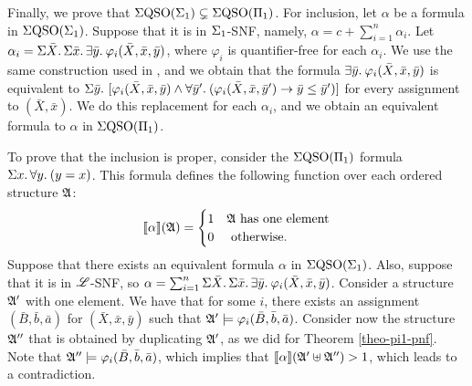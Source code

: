 Finally, we prove that $\Sigma{\rm QSO}(\Sigma_{1})\subsetneq\Sigma{\rm QSO}(\Pi_{1})$. 
For inclusion, let $\alpha$ be a formula in $\Sigma{\rm QSO}(\Sigma_{1})$. 
Suppose that it is in $\Sigma_{1}$-SNF, namely, $\alpha = c + \sum_{i = 1}^{n}\alpha_i$. 
Let $\alpha_i = \Sigma{\bar{X}}.\,\Sigma{\bar{x}}.\,\exists{\bar{y}}.\:\varphi_i(\bar{X},\bar{x},\bar{y})$, where $\varphi_i$ is quantifier-free for each $\alpha_i$. 
We use the same construction used in \cite{SalujaST95}, and we obtain that the formula $\exists{\bar{y}}.\:\varphi_i(\bar{X},\bar{x},\bar{y})$ is equivalent to $\Sigma{\bar{y}}.\,\,[\varphi_i(\bar{X},\bar{x},\bar{y}) \wedge \forall{\bar{y}'}.\:(\varphi_i(\bar{X},\bar{x},\bar{y}')\to\bar{y}\leq\bar{y}')]$ for every assignment to $(\bar{X},\bar{x})$. 
We do this replacement for each $\alpha_i$, and we obtain an equivalent formula to $\alpha$ in $\Sigma{\rm QSO}(\Pi_{1})$.

To prove that the inclusion is proper, consider the $\Sigma{\rm QSO}(\Pi_{1})$ formula $\Sigma{x}.\, \forall{y}.\:(y = x)$. 
This formula defines the following function over each ordered structure $\mathfrak{A}$:
$$
{\llbracket{}{\alpha}\rrbracket}(\mathfrak{A}) = 
\begin{cases}
1 &\mathfrak{A} \text{ has one element}\\
0 &\text{ otherwise}.
\end{cases}
$$
Suppose that there exists an equivalent formula $\alpha$ in $\Sigma{\rm QSO}(\Sigma_{1})$. 
Also, suppose that it is in $\mathscr{L}$-SNF, so $\alpha = \sum_{i = 1}^n\Sigma{\bar{X}}.\,\Sigma{\bar{x}}.\,\exists{\bar{y}}.\:\varphi_i(\bar{X},\bar{x},\bar{y})$. 
Consider a structure $\mathfrak{A}'$ with one element. 
We have that for some $i$, there exists an assignment $(\bar{B},\bar{b},\bar{a})$ for $(\bar{X},\bar{x},\bar{y})$ such that $\mathfrak{A}' \models\varphi_i(\bar{B},\bar{b},\bar{a})$. 
Consider now the structure $\mathfrak{A}''$ that is obtained by duplicating $\mathfrak{A}'$, as we did for Theorem \ref{theo-pi1-pnf}. 
Note that $\mathfrak{A}''\models\varphi_i(\bar{B},\bar{b},\bar{a})$, which implies that ${\llbracket{}{\alpha}\rrbracket}(\mathfrak{A}' \uplus \mathfrak{A}'') > 1$, which leads to a contradiction.
